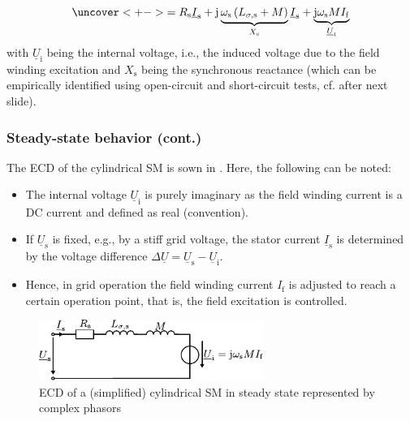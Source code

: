 \begin{frame}
\begin{equation}
\begin{split}
			\uncover<+->{= R_\mathrm{s} \underline{I}_\mathrm{s} + \mathrm{j} \underbrace{\omega_\mathrm{s} \left(L_{\sigma,\mathrm{s}} + M\right)}_{X_\mathrm{s}}\underline{I}_\mathrm{s} + \underbrace{\mathrm{j}\omega_\mathrm{s} M I_\mathrm{f}}_{\underline{U}_\mathrm{i}}}
		\end{split}
		\label{eq:SM_voltage_steady_state}
	\end{equation}
	\onslide<+->
	with $\underline{U}_\mathrm{i}$ being the internal voltage, i.e., the induced voltage due to the field winding excitation and $X_\mathrm{s}$ being the synchronous reactance (which can be empirically identified using open-circuit and short-circuit tests, cf. after next slide).
\end{frame}

\begin{frame}
	\frametitle{Steady-state behavior (cont.)} 
	The ECD of the cylindrical SM is sown in . \onslide<2->Here, the following can be noted:
	\begin{itemize}
		\item<2-> The internal voltage $\underline{U}_\mathrm{i}$ is purely imaginary as the field winding current is a DC current and defined as real (convention).
		\item<3-> If $\underline{U}_\mathrm{s}$ is fixed, e.g., by a stiff grid voltage, the stator current $\underline{I}_\mathrm{s}$ is determined by the voltage difference $\Delta\underline{U} = \underline{U}_\mathrm{s} - \underline{U}_\mathrm{i}$.
		\item<4-> Hence, in grid operation the field winding current $I_\mathrm{f}$ is adjusted to reach a certain operation point, that is, the field excitation is controlled.
	\end{itemize}
    \begin{figure}
        \centering
        \includegraphics[width=0.65\textwidth]{fig/lec07/SM_ECD_steady_state.pdf}
        \caption{ECD of a (simplified) cylindrical SM in steady state represented by complex phasors}
        \label{fig:SM_ECD_steady_state}
    \end{figure}
\end{frame}

